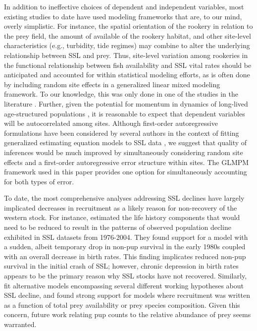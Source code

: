 \documentclass[nonumbib,leqno]{nrc1}
\begin{document}
In addition to ineffective choices of dependent and independent variables, most existing studies to date have used
modeling frameworks that are, to our mind, overly simplistic.  For instance, the spatial orientation of the rookery in relation to the prey field, the amount of available of the rookery habitat, and other site-level characteristics (e.g., turbidity, tide regimes) may combine to alter the underlying relationship between SSL and prey. Thus, site-level variation among rookeries in the functional relationship between fish availability and SSL vital rates should be anticipated and accounted for within statistical modeling efforts, as is often done by including random site effects in a generalized linear mixed modeling \citep{McCulloch2006} framework.  To our knowledge, this was only done in one of the studies in the literature \citep[i.e.,][]{Hui:2011uq}.  Further, given the potential for momentum in dynamics of long-lived age-structured populations \citep[see e.g.,][for a review]{EzardEtAl2010}, it is reasonable to expect that dependent variables will be autocorrelated among sites.  Although first-order autoregressive formulations have been considered by several authors in the context of fitting generalized estimating equation models to SSL data \citep[e.g.,][]{Dillingham:2006fv,Trites:2010ly}, we suggest that quality of inferences would be much improved by simultaneously considering random site effects and a first-order autoregressive error structure within sites.  The GLMPM framework used in this paper provides one option for simultaneously accounting for both types of error.

To date, the most comprehensive analyses addressing SSL declines have largely implicated decreases in recruitment as a likely reason for non-recovery of the western stock.  For instance, \citet{HolmesEtAl2007} estimated the life history components that would need to be reduced to result in
the patterns of observed population decline exhibited in SSL datasets from 1976-2004.  They found support for a model with a sudden, albeit temporary drop in non-pup survival in the early 1980s coupled with an overall decrease in birth rates.  This finding implicates reduced non-pup survival in the initial crash of SSL; however, chronic depression in birth rates appears to be the primary reason why SSL stocks have not recovered.  Similarly, \citet{Wolf:2008qf} fit alternative models encompassing several different working hypotheses about SSL decline, and found strong support for models where recruitment was written as a function of total prey availability or prey species composition.  Given this concern, future work relating pup counts to the relative abundance of prey seems warranted.
\end{document}
